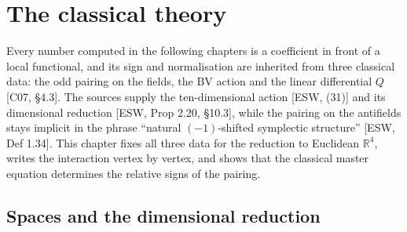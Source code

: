 \chapter{The classical theory}

Every number computed in the following chapters is a coefficient in front of a local functional, and its sign and normalisation are inherited from three classical data: the odd pairing on the fields, the BV action and the linear differential $Q$ [C07, §4.3]. The sources supply the ten-dimensional action [ESW, (31)] and its dimensional reduction [ESW, Prop 2.20, §10.3], while the pairing on the antifields stays implicit in the phrase ``natural $(-1)$-shifted symplectic structure'' [ESW, Def 1.34]. This chapter fixes all three data for the reduction to Euclidean $\mathbb R^4$, writes the interaction vertex by vertex, and shows that the classical master equation determines the relative signs of the pairing.

\section{Spaces and the dimensional reduction}

